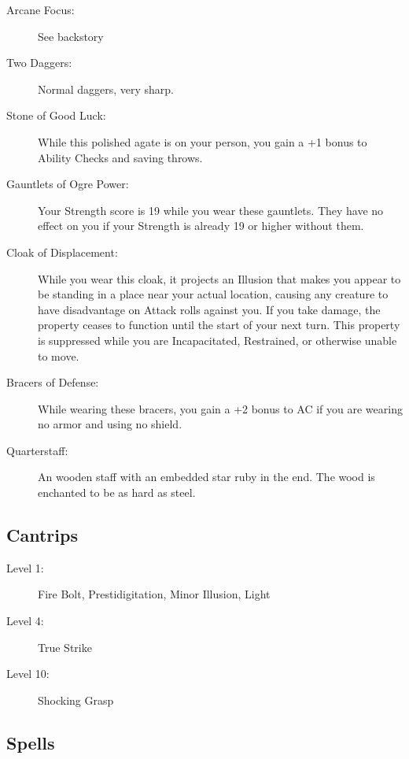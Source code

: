 \documentclass[letterpaper,10pt,twoside,twocolumn,openany]{book}
\begin{document}
\begin{description}
	\item[Arcane Focus:] See backstory
	\item[Two Daggers:] Normal daggers, very sharp.
	\item[Stone of Good Luck:] While this polished agate is on your person, you gain a +1 bonus to Ability Checks and saving throws.
	\item[Gauntlets of Ogre Power:] Your Strength score is 19 while you wear these gauntlets. They have no effect on you if your Strength is already 19 or higher without them.
	\item[Cloak of Displacement:] While you wear this cloak, it projects an Illusion that makes you appear to be standing in a place near your actual location, causing any creature to have disadvantage on Attack rolls against you. If you take damage, the property ceases to function until the start of your next turn. This property is suppressed while you are Incapacitated, Restrained, or otherwise unable to move.
	\item[Bracers of Defense:] While wearing these bracers, you gain a +2 bonus to AC if you are wearing no armor and using no shield.
	\item[Quarterstaff:] An wooden staff with an embedded star ruby in the end. The wood is enchanted to be as hard as steel.
\end{description}

\subsection{Cantrips}

\begin{description}
	\item[Level 1:] Fire Bolt, Prestidigitation, Minor Illusion, Light
	\item[Level 4:] True Strike
	\item[Level 10:] Shocking Grasp
\end{description}

\subsection{Spells}
\end{document}

